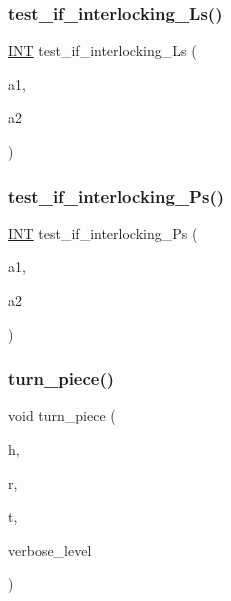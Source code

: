 \subsubsection{\texorpdfstring{test\+\_\+if\+\_\+interlocking\+\_\+\+Ls()}{test\_if\_interlocking\_Ls()}}
{\footnotesize\ttfamily \mbox{\hyperlink{galois_8h_a09fddde158a3a20bd2dcadb609de11dc}{I\+NT}} test\+\_\+if\+\_\+interlocking\+\_\+\+Ls (\begin{DoxyParamCaption}\item[{\mbox{\hyperlink{galois_8h_a09fddde158a3a20bd2dcadb609de11dc}{I\+NT}}}]{a1,  }\item[{\mbox{\hyperlink{galois_8h_a09fddde158a3a20bd2dcadb609de11dc}{I\+NT}}}]{a2 }\end{DoxyParamCaption})}

\mbox{\label{pentomino__5x5_8_c_a4cd6485acb185417e158c1167a3dcfad}} 
\subsubsection{\texorpdfstring{test\+\_\+if\+\_\+interlocking\+\_\+\+Ps()}{test\_if\_interlocking\_Ps()}}
{\footnotesize\ttfamily \mbox{\hyperlink{galois_8h_a09fddde158a3a20bd2dcadb609de11dc}{I\+NT}} test\+\_\+if\+\_\+interlocking\+\_\+\+Ps (\begin{DoxyParamCaption}\item[{\mbox{\hyperlink{galois_8h_a09fddde158a3a20bd2dcadb609de11dc}{I\+NT}}}]{a1,  }\item[{\mbox{\hyperlink{galois_8h_a09fddde158a3a20bd2dcadb609de11dc}{I\+NT}}}]{a2 }\end{DoxyParamCaption})}

\mbox{\label{pentomino__5x5_8_c_afeaa9ad5370af3cec823a11a292bbf52}} 
\subsubsection{\texorpdfstring{turn\+\_\+piece()}{turn\_piece()}}
{\footnotesize\ttfamily void turn\+\_\+piece (\begin{DoxyParamCaption}\item[{\mbox{\hyperlink{galois_8h_a09fddde158a3a20bd2dcadb609de11dc}{I\+NT}} \&}]{h,  }\item[{\mbox{\hyperlink{galois_8h_a09fddde158a3a20bd2dcadb609de11dc}{I\+NT}} \&}]{r,  }\item[{\mbox{\hyperlink{galois_8h_a09fddde158a3a20bd2dcadb609de11dc}{I\+NT}} \&}]{t,  }\item[{\mbox{\hyperlink{galois_8h_a09fddde158a3a20bd2dcadb609de11dc}{I\+NT}}}]{verbose\+\_\+level }\end{DoxyParamCaption})}



